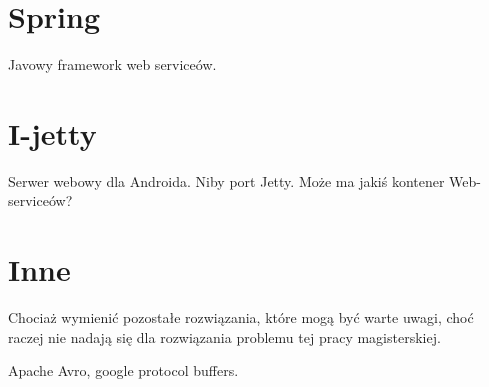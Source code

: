 \section{Spring}
Javowy framework web serviceów.


\section{I-jetty}
Serwer webowy dla Androida. Niby port Jetty. Może ma jakiś kontener Web-serviceów?

\section{Inne}
Chociaż wymienić pozostałe rozwiązania, które mogą być warte uwagi, choć raczej nie nadają się dla rozwiązania problemu tej pracy magisterskiej.

Apache Avro, google protocol buffers.

